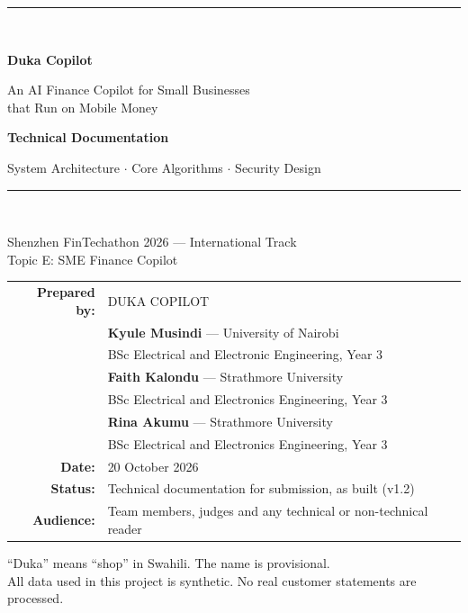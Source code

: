 \documentclass[10pt,a4paper]{article}
\begin{document}
\begin{titlepage}
\centering
\vspace*{2.2cm}
{\color{navy}\rule{\linewidth}{1.4pt}}\\[1.2cm]
{\Huge\bfseries\color{navy} Duka Copilot\par}
\vspace{0.4cm}
{\Large An AI Finance Copilot for Small Businesses\\that Run on Mobile Money\par}
\vspace{0.9cm}
{\LARGE\bfseries Technical Documentation\par}
\vspace{0.3cm}
{\large System Architecture $\cdot$ Core Algorithms $\cdot$ Security Design\par}
\vspace{1.2cm}
{\color{navy}\rule{\linewidth}{1.4pt}}\\[1.4cm]
{\large Shenzhen FinTechathon 2026 --- International Track\\[2pt]
Topic E: SME Finance Copilot\par}
\vspace{2.2cm}
\begin{tabular}{rl}
\textbf{Prepared by:} & DUKA COPILOT\\
 & \textbf{Kyule Musindi} --- University of Nairobi\\
 & \small BSc Electrical and Electronic Engineering, Year 3\\[3pt]
 & \textbf{Faith Kalondu} --- Strathmore University\\
 & \small BSc Electrical and Electronics Engineering, Year 3\\[3pt]
 & \textbf{Rina Akumu} --- Strathmore University\\
 & \small BSc Electrical and Electronics Engineering, Year 3\\[3pt]
\textbf{Date:} & 20 October 2026\\
\textbf{Status:} & Technical documentation for submission, as built (v1.2)\\
\textbf{Audience:} & Team members, judges and any technical or non-technical reader\\
\end{tabular}
\vfill
{\small\color{gray} ``Duka'' means ``shop'' in Swahili. The name is provisional.\\
All data used in this project is synthetic. No real customer statements are processed.}
\end{titlepage}
\end{document}
